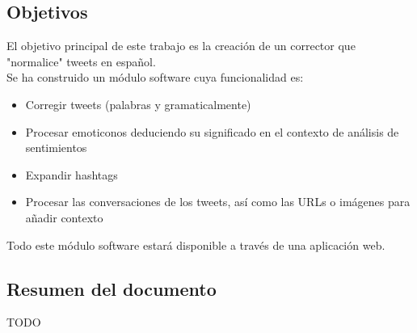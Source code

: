 \documentclass[14pt]{extarticle}
\theoremstyle{definition}
\theoremstyle{remark}
\begin{document}
\subsection{Objetivos}\label{sec:objetivos}
El objetivo principal de este trabajo es la creación de un corrector que "normalice" tweets en español.\\Se ha construido un módulo software cuya funcionalidad es:
\begin{itemize}
\item Corregir tweets (palabras y gramaticalmente)
\item Procesar emoticonos deduciendo su significado en el contexto de análisis de sentimientos
\item Expandir hashtags
\item Procesar las conversaciones de los tweets, así como las URLs o imágenes para añadir contexto
\end{itemize}
Todo este módulo software estará disponible a través de una aplicación web.

\subsection{Resumen del documento}\label{sec:resumen}
TODO
\end{document}
